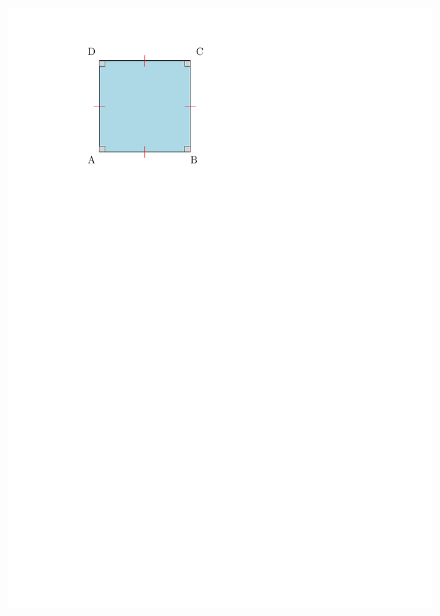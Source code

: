 \documentclass[paper=a4, fontsize=9pt]{scrartcl} %
\begin{document}
\begin{multicols}{2}
	\begin{figure}[H]
	  \centering
	  \includegraphics[width=0.6\linewidth]{sources/1/carre.pdf}
	\end{figure}

\end{multicols}
\end{document}
